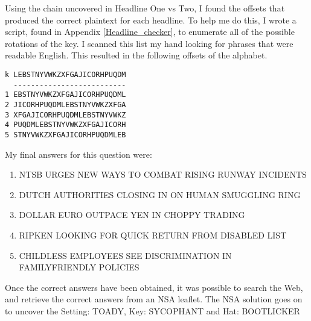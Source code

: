 \documentclass[11pt,a4paper,twoside]{article}
\begin{document}
\pagebreak

Using the chain uncovered in Headline One vs Two, I found the offsets that
produced the correct plaintext for each headline. To help me do this, I wrote a
script, found in Appendix \ref{Headline_checker}, to enumerate all of the
possible rotations of the key. I scanned this list my hand looking for phrases
that were readable English. This resulted in the following offsets of the
alphabet. 

\begin{lstlisting}
k LEBSTNYVWKZXFGAJICORHPUQDM
  --------------------------
1 EBSTNYVWKZXFGAJICORHPUQDML
2 JICORHPUQDMLEBSTNYVWKZXFGA
3 XFGAJICORHPUQDMLEBSTNYVWKZ
4 PUQDMLEBSTNYVWKZXFGAJICORH
5 STNYVWKZXFGAJICORHPUQDMLEB
\end{lstlisting}

My final answers for this question were: 

\begin{enumerate}[noitemsep]
\item NTSB URGES NEW WAYS TO COMBAT RISING RUNWAY INCIDENTS
\item DUTCH AUTHORITIES CLOSING IN ON HUMAN SMUGGLING RING
\item DOLLAR EURO OUTPACE YEN IN CHOPPY TRADING
\item RIPKEN LOOKING FOR QUICK RETURN FROM DISABLED LIST
\item CHILDLESS EMPLOYEES SEE DISCRIMINATION IN FAMILYFRIENDLY POLICIES
\end{enumerate}

Once the correct answers have been obtained, it was possible to search the Web,
and retrieve the correct answers from an NSA leaflet. The NSA solution goes on
to uncover the Setting: TOADY, Key: SYCOPHANT and Hat: BOOTLICKER


%
%
%
\end{document}
